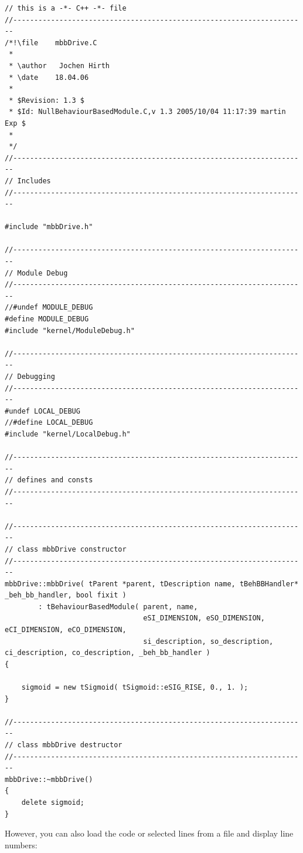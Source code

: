 \begin{lstlisting} 
// this is a -*- C++ -*- file
//----------------------------------------------------------------------
/*!\file    mbbDrive.C
 *
 * \author   Jochen Hirth
 * \date    18.04.06
 *
 * $Revision: 1.3 $
 * $Id: NullBehaviourBasedModule.C,v 1.3 2005/10/04 11:17:39 martin Exp $
 *
 */ 
//----------------------------------------------------------------------
// Includes
//----------------------------------------------------------------------

#include "mbbDrive.h"

//----------------------------------------------------------------------
// Module Debug
//----------------------------------------------------------------------
//#undef MODULE_DEBUG
#define MODULE_DEBUG
#include "kernel/ModuleDebug.h"

//----------------------------------------------------------------------
// Debugging
//----------------------------------------------------------------------
#undef LOCAL_DEBUG 
//#define LOCAL_DEBUG
#include "kernel/LocalDebug.h"

//----------------------------------------------------------------------
// defines and consts
//----------------------------------------------------------------------

//----------------------------------------------------------------------
// class mbbDrive constructor
//----------------------------------------------------------------------
mbbDrive::mbbDrive( tParent *parent, tDescription name, tBehBBHandler* _beh_bb_handler, bool fixit )
        : tBehaviourBasedModule( parent, name,
                                 eSI_DIMENSION, eSO_DIMENSION, eCI_DIMENSION, eCO_DIMENSION,
                                 si_description, so_description, ci_description, co_description, _beh_bb_handler )
{

    sigmoid = new tSigmoid( tSigmoid::eSIG_RISE, 0., 1. );
}

//----------------------------------------------------------------------
// class mbbDrive destructor
//----------------------------------------------------------------------
mbbDrive::~mbbDrive()
{
    delete sigmoid;
}

\end{lstlisting}

However, you can also load the code or selected lines from a file and display line numbers:

\begin{verbatim}


\end{verbatim}

